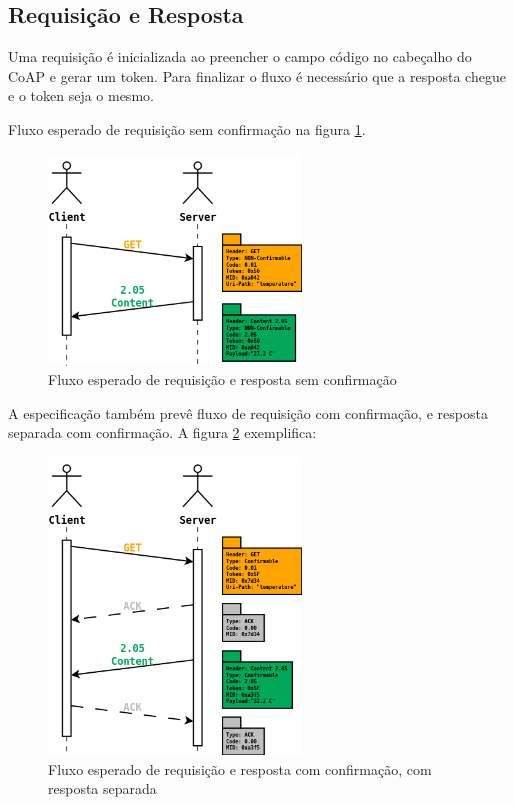 \subsection{Requisi\c{c}\~ao e Resposta}

Uma requisi\c{c}\~ao \'e inicializada ao preencher o campo c\'odigo no cabe\c{c}alho do CoAP e gerar um token.
Para finalizar o fluxo \'e necess\'ario que a resposta chegue e o token seja o mesmo.

Fluxo esperado de requisi\c{c}\~ao sem confirma\c{c}\~ao na figura \ref{nonConfirmable}.
\begin{figure}[H]
   \centering
   \includegraphics[width=0.6\textwidth]{figuras/nonconfirmable.png}
   \caption{Fluxo esperado de requisi\c{c}\~ao e resposta sem confirma\c{c}\~ao}
   \label{nonConfirmable}
\end{figure}

A especifica\c{c}\~ao tamb\'em prev\^e fluxo de requisi\c{c}\~ao com confirma\c{c}\~ao, e resposta separada com confirma\c{c}\~ao. A figura \ref{separateResponse} exemplifica:

\begin{figure}[H]
   \centering
   \includegraphics[width=0.6\textwidth]{figuras/separateresponse.png}
   \caption{Fluxo esperado de requisi\c{c}\~ao e resposta com confirma\c{c}\~ao, com resposta separada}
   \label{separateResponse}
\end{figure}

